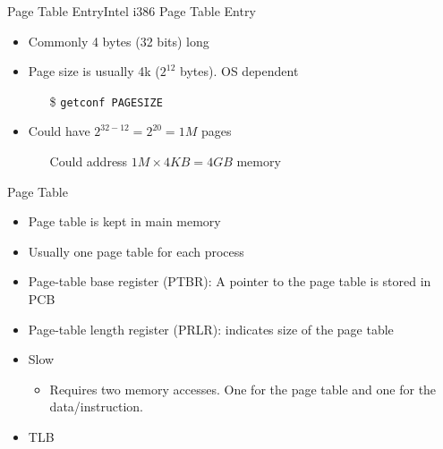 
\begin{frame}{Page Table Entry}{Intel i386 Page Table Entry}
  \begin{itemize}
  \item Commonly 4 bytes (32 bits) long
  \item Page size is usually 4k ($2^{12}$ bytes). OS dependent
    \begin{itemize}
    \item[\$] \texttt{getconf PAGESIZE}
    \end{itemize}
  \item Could have $2^{32-12}=2^{20}=1M$ pages
    \begin{itemize}
    \item[] Could address $1M\times{}4KB=4GB$ memory
    \end{itemize}
  \end{itemize}
  \begin{center}
  \end{center}
\end{frame}

\begin{frame}{Page Table}
  \begin{itemize}
  \item Page table is kept in main memory
  \item Usually one page table for each process
  \item \alert{Page-table base register (PTBR):} A pointer to the page table is stored in
    PCB
  \item \alert{Page-table length register (PRLR):} indicates size of the page table
  \item Slow
    \begin{itemize}
    \item Requires two memory accesses. One for the page table and one for the
      data/instruction.
    \end{itemize}
  \item TLB
  \end{itemize}
\end{frame}

